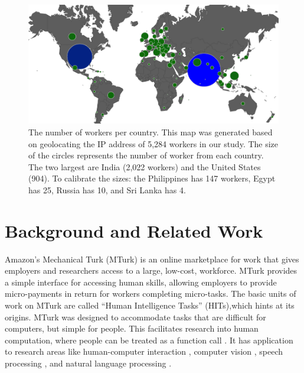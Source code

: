 \documentclass[11pt]{article}
\begin{document}
\begin{figure}[h]
\centering
\includegraphics[width=\linewidth]{figures/turkermap-color-cropped}
\caption{The number of workers per country.  This map was generated based on geolocating the IP address of  5,284 workers in our study.  The size of the circles represents the number of worker from each country.  The two largest are India (2,022 workers) and the United States (904).  To calibrate the sizes: the Philippines has 147 workers, Egypt has 25, Russia has 10, and Sri Lanka has 4.}
\label{map}
\end{figure}



\section{Background and Related Work}
Amazon's Mechanical Turk (MTurk) is an online marketplace for work that gives employers and researchers access to a large, low-cost, workforce. MTurk provides a simple interface for accessing human skills, allowing employers to provide micro-payments in return for workers completing micro-tasks.  The basic units of work on MTurk are called ``Human Intelligence Tasks'' (HITs),which hints at its origins.  MTurk was designed to accommodate tasks that are difficult for computers, but simple for people. This facilitates research into human computation, where people can be treated as a function call \cite{vonAhnThesis,Little2009,quinn-bederson:2011}.  It has application to research areas like human-computer interaction \cite{bigham-et-al:2010,bernstein-et-al:2010}, computer vision  \cite{sorkin-forsyth:2008,deng-et-al:2010,rashtchian:10}, speech processing \cite{marge:10,lane-EtAl:2010:MTURK,Parent-Eskenazi:2011,Eskenazi:2013:crowdsourcing-speech-book},  and natural language processing \cite{Snow2008,callisonburch-dredze:2010:MTURK,laws-scheible-schutze:2011:EMNLP}. 
\end{document}
